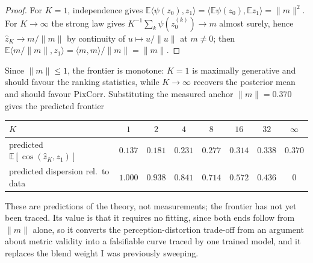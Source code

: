 \documentclass[11pt,a4paper]{article}
\newcommand{\E}{\mathbb{E}}
\theoremstyle{plain}
\theoremstyle{remark}
\begin{document}
\begin{proof}
For $K=1$, independence gives
$\E\langle\psi(z_0),z_1\rangle=\langle\E\psi(z_0),\E z_1\rangle=\lVert m\rVert^2$.
For $K\to\infty$ the strong law gives $K^{-1}\sum_k\psi(z_0^{(k)})\to m$ almost
surely, hence $\hat z_K\to m/\lVert m\rVert$ by continuity of $u\mapsto
u/\lVert u\rVert$ at $m\neq0$; then
$\E\langle m/\lVert m\rVert, z_1\rangle=\langle m,m\rangle/\lVert m\rVert
=\lVert m\rVert$.
\end{proof}

\noindent
Since $\lVert m\rVert\le1$, the frontier is monotone: $K=1$ is maximally
generative and should favour the ranking statistics, while $K\to\infty$ recovers
the posterior mean and should favour PixCorr. Substituting the measured anchor
$\lVert m\rVert=0.370$ gives the predicted frontier

\begin{center}
\footnotesize
\begin{tabular}{@{}lccccccc@{}}
\toprule
$K$ & $1$ & $2$ & $4$ & $8$ & $16$ & $32$ & $\infty$ \\
\midrule
predicted $\E[\cos(\hat z_K,z_1)]$ & $0.137$ & $0.181$ & $0.231$ & $0.277$ & $0.314$ & $0.338$ & $0.370$ \\
predicted dispersion rel.\ to data & $1.000$ & $0.938$ & $0.841$ & $0.714$ & $0.572$ & $0.436$ & $0$ \\
\bottomrule
\end{tabular}
\end{center}

\noindent
These are predictions of the theory, not measurements; the frontier has not yet
been traced. Its value is that it requires no fitting, since both ends follow
from $\lVert m\rVert$ alone, so it converts the perception-distortion trade-off
from an argument about metric validity into a falsifiable curve traced by one
trained model, and it replaces the blend weight I was previously sweeping.
\end{document}
